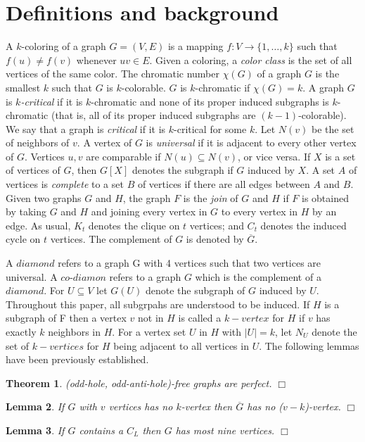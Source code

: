 \documentclass[12pt]{article}
\newtheorem{Theorem}{Theorem}[section]
\newtheorem{Lemma}[Theorem]{Lemma}
\begin{document}
\section{Definitions and background}\label{sec:definitions}
A $k$-coloring of a graph $G=(V,E)$ is a mapping $f: V \rightarrow \{1,\ldots, k\}$ such that $f(u) \not= f(v)$ whenever $uv \in E$. Given a coloring, a {\it color class} is the set of all vertices of the same color.  The chromatic number $\chi(G)$ of a graph $G$ is the smallest $k$ such that $G$ is $k$-colorable.  $G$ is $k$-chromatic if $\chi(G) = k$.  A graph $G$ is {\em $k$-critical} if it is $k$-chromatic and none of its proper induced subgraphs is $k$-chromatic (that is, all of its proper induced subgraphs are $(k-1)$-colorable).  We say that a graph is {\it critical} if it is $k$-critical for some $k$.  Let $N(v)$ be the set of neighbors of $v$. A vertex of $G$ is {\it universal} if it is adjacent to every other vertex of $G$. Vertices $u,v$ are comparable if $N(u) \subseteq N(v)$, or vice versa. If $X$ is a set of vertices of $G$, then $G[X]$ denotes the subgraph if $G$ induced by $X$.  A set $A$ of vertices is {\it complete} to a set $B$ of vertices if there are all edges between $A$ and $B$.  Given two graphs $G$ and $ H$, the graph $F$ is the {\it join} of $G$ and $H$ if $F$ is obtained by taking $G$ and $H$ and joining every vertex in $G$ to every vertex in $H$ by an edge.  As usual, $K_t$ denotes the clique on $t$ vertices; and $C_t$ denotes the induced cycle on $t$ vertices. The complement of $G$ is denoted by $\overline{G}$. 

A $diamond$ refers to a graph G with 4 vertices such that two vertices are universal. A $co$-$diamon$ refers to a graph $G$ which is the complement of a $diamond$. For $U \subseteq V$ let $G(U)$ denote the subgraph of $G$ induced by $U$. Throughout this paper, all subgrpahs are understood to be induced. If $H$ is a subgraph of F then a vertex $v$ not in $H$ is called a $k-vertex$ for $H$ if $v$ has exactly $k$ neighbors in $H$. For a vertex set $U$ in $H$ with $|U| = k$, let $N_U$ denote the set of $k-vertices$ for $H$ being adjacent to all vertices in $U$.  The following lemmas have been previously established.

\begin{Theorem}\label{thm:strong-perfect}
(odd-hole, odd-anti-hole)-free graphs are perfect. $\Box$
\end{Theorem}

\begin{Lemma}\label{lem:complement-k-vertex}
If $G$ with $v$ vertices has no $k$-vertex then $\overline{G}$ has no ($v-k$)-vertex. $\Box$
\end{Lemma}
\begin{Lemma}\label{lem:c5-9v}{\rm \cite{BraFud2002}}
If $G$ contains a $C_L$ then $G$ has most nine vertices. $\Box$
\end{Lemma}
\end{document}
